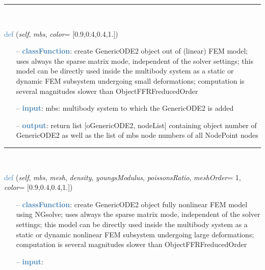 \begin{itemize}[leftmargin=1.4cm]
\begin{itemize}[leftmargin=0.5cm]
\begin{itemize}[leftmargin=1.4cm]
\begin{itemize}[leftmargin=1.4cm]
\begin{itemize}[leftmargin=0.5cm]
%
\noindent\rule{8cm}{0.75pt}\vspace{1pt} \\ 
\begin{flushleft}
\noindent \textcolor{steelblue}{def {\bf {}}}\label{sec:FEM:FEMinterface:CreateLinearFEMObjectGenericODE2}
({\it self}, {\it mbs}, {\it color}= [0.9,0.4,0.4,1.])
\end{flushleft}
\setlength{\itemindent}{0.7cm}
\begin{itemize}[leftmargin=0.7cm]
  \item[--]  \textcolor{steelblue}{\bf classFunction}: create GenericODE2 object out of (linear) FEM model; uses always the sparse matrix mode, independent of the solver settings; this model can be directly used inside the multibody system as a static or dynamic FEM subsystem undergoing small deformations; computation is several magnitudes slower than ObjectFFRFreducedOrder  \item[--]  \textcolor{steelblue}{\bf input}: mbs: multibody system to which the GenericODE2 is added  \item[--]  \textcolor{steelblue}{\bf output}: return list [oGenericODE2, nodeList] containing object number of GenericODE2 as well as the list of mbs node numbers of all NodePoint nodes\vspace{12pt}\end{itemize}
%
\noindent\rule{8cm}{0.75pt}\vspace{1pt} \\ 
\begin{flushleft}
\noindent \textcolor{steelblue}{def {\bf {}}}\label{sec:FEM:FEMinterface:CreateNonlinearFEMObjectGenericODE2NGsolve}
({\it self}, {\it mbs}, {\it mesh}, {\it density}, {\it youngsModulus}, {\it poissonsRatio}, {\it meshOrder}= 1, {\it color}= [0.9,0.4,0.4,1.])
\end{flushleft}
\setlength{\itemindent}{0.7cm}
\begin{itemize}[leftmargin=0.7cm]
  \item[--]  \textcolor{steelblue}{\bf classFunction}: create GenericODE2 object fully nonlinear FEM model using NGsolve; uses always the sparse matrix mode, independent of the solver settings; this model can be directly used inside the multibody system as a static or dynamic nonlinear FEM subsystem undergoing large deformations; computation is several magnitudes slower than ObjectFFRFreducedOrder  \item[--]  \textcolor{steelblue}{\bf input}: \vspace{-6pt}

\end{itemize}
\end{itemize}
\end{itemize}
\end{itemize}
\end{itemize}
\end{itemize}
